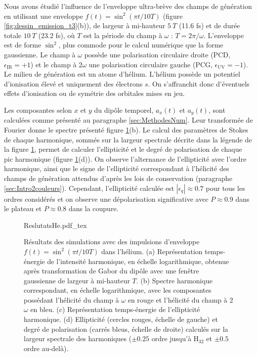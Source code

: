 Nous avons étudié l'influence de l'enveloppe ultra-brève des champs de génération en utilisant une enveloppe $f(t) = \sin^2 (\pi t / 10 T)$ (figure \ref{fig:dessin_emission_t3}(b)), de largeur à mi-hauteur $5 \: T$ (11.6 fs) et de durée totale $10 \: T$ (23.2 fs), où $T$ est la période du champ à $\omega$ : $T = 2\pi/\omega$. L'enveloppe est de forme $\sin^2$, plus commode pour le calcul numérique que la forme gaussienne. Le champ à $\omega$ possède une polarisation circulaire droite (PCD, $\epsilon_{\text{IR}} = +1$) et le champ à 2$\omega$ une polarisation circulaire gauche (PCG,  $\epsilon_{\text{UV}} = -1$). Le milieu de génération est un atome d'hélium. L'hélium possède un potentiel d'ionisation élevé et uniquement des électrons $s$. On s'affranchit donc d'éventuels effets d'ionisation ou de symétrie des orbitales mises en jeu.

Les composantes selon $x$ et $y$ du dipôle temporel, $a_x (t)$ et $a_y(t)$, sont calculées comme présenté au paragraphe \ref{sec:MethodesNum}. Leur transformée de Fourier donne le spectre présenté figure \ref{fig:ResultatsHe}(b). Le calcul des paramètres de Stokes de chaque harmonique, sommés sur la largeur spectrale décrite dans la légende de la figure \ref{fig:ResultatsHe}, permet de calculer l'ellipticité et le degré de polarisation de chaque pic harmonique (figure \ref{fig:ResultatsHe}(d)). On observe l'alternance de l'ellipticité avec l'ordre harmonique, ainsi que le signe de l'ellipticité correspondant à l'hélicité des champs de génération attendus d'après les lois de conservation (paragraphe \ref{sec:Intro2couleurs}). Cependant, l'ellipticité calculée est $|\epsilon_q| \approx 0.7$ pour tous les ordres considérés et on observe une dépolarisation significative avec $P \approx 0.9$ dans le plateau et $P \approx 0.8$ dans la coupure.

\begin{figure}
\centering
\def\svgwidth{\textwidth}
{ReslutatsHe.pdf_tex}
\caption{Résultats des simulations avec des impulsions d'enveloppe $f(t) = \sin^2 (\pi t / 10 T)$ dans l'hélium. (a) Représentation temps-énergie de l'intensité harmonique, en échelle logarithmique, obtenue après transformation de Gabor du dipôle avec une fenêtre gaussienne de largeur à mi-hauteur $T$. (b) Spectre harmonique correspondant, en échelle logarithmique, avec les composantes possédant l'hélicité du champ à $\omega$ en rouge et l'hélicité du champ à 2$\omega$ en bleu. (c) Représentation temps-énergie de l'ellipticité harmonique. (d) Ellipticité (cercles rouges, échelle de gauche) et degré de polarisation (carrés bleus, échelle de droite) calculés sur la largeur spectrale des harmoniques ($\pm 0.25$ ordre jusqu'à H$_{32}$ et $\pm 0.5$ ordre au-delà).}
\label{fig:ResultatsHe}
\end{figure}


